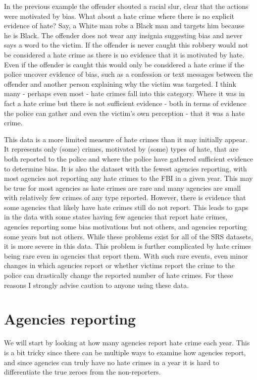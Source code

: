 \documentclass[
]{krantz}
\begin{document}
In the previous example the offender shouted a racial slur,
clear that the actions were motivated by bias. What about a
hate crime where there is no explicit evidence of hate? Say,
a White man robs a Black man and targets him because he is
Black. The offender does not wear any insignia suggesting
bias and never says a word to the victim. If the offender is
never caught this robbery would not be considered a hate
crime as there is no evidence that it is motivated by hate.
Even if the offender is caught this would only be considered
a hate crime if the police uncover evidence of bias, such as
a confession or text messages between the offender and
another person explaining why the victim was targeted. I
think many - perhaps even most - hate crimes fall into this
category. Where it was in fact a hate crime but there is not
sufficient evidence - both in terms of evidence the police
can gather and even the victim's own perception - that it
was a hate crime.

This data is a more limited measure of hate crimes than it
may initially appear. It represents only (some) crimes,
motivated by (some) types of hate, that are both reported to
the police and where the police have gathered sufficient
evidence to determine bias. It is also the dataset with the
fewest agencies reporting, with most agencies not reporting
any hate crimes to the FBI in a given year. This may be true
for most agencies as hate crimes are rare and many agencies
are small with relatively few crimes of any type reported.
However, there is evidence that some agencies that likely
have hate crimes still do not report. This leads to gaps in
the data with some states having few agencies that report
hate crimes, agencies reporting some bias motivations but
not others, and agencies reporting some years but not
others. While these problems exist for all of the SRS
datasets, it is more severe in this data. This problem is
further complicated by hate crimes being rare even in
agencies that report them. With such rare events, even minor
changes in which agencies report or whether victims report
the crime to the police can drastically change the reported
number of hate crimes. For these reasons I strongly advise
caution to anyone using these data.

\section{Agencies reporting}\label{agencies-reporting-5}

We will start by looking at how many agencies report hate
crime each year. This is a bit tricky since there can be
multiple ways to examine how agencies report, and since
agencies can truly have no hate crimes in a year it is hard
to differentiate the true zeroes from the non-reporters.
\end{document}

